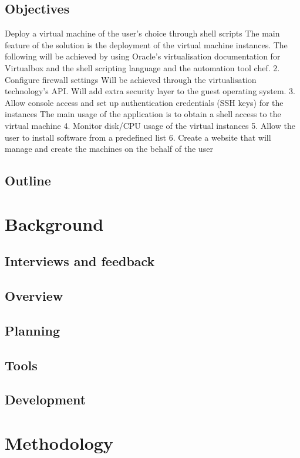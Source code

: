 \documentclass{article}
\begin{document}
	  \subsection{Objectives}
	  Deploy a virtual machine of the user's choice through shell scripts The main feature of the solution is the deployment of the virtual machine instances. The
	  following will be achieved by using Oracle's virtualisation documentation for Virtualbox and
	  the shell scripting language and the automation tool chef.
	  2. Configure firewall settings
	  Will be achieved through the virtualisation technology's API. Will add extra security layer to
	  the guest operating system.
	  3. Allow console access and set up authentication credentials (SSH keys) for the instances
	  The main usage of the application is to obtain a shell access to the virtual machine
	  4. Monitor disk/CPU usage of the virtual instances
	  5. Allow the user to install software from a predefined list
	  6. Create a website that will manage and create the machines on the behalf of the user
  \subsection{Outline}

  \newpage
  \section{Background}
  \subsection{Interviews and feedback}

  \subsection{Overview}
  \subsection{Planning}
  \subsection{Tools}
  \subsection{Development}
  

  \newpage
  \section{Methodology}
\end{document}
